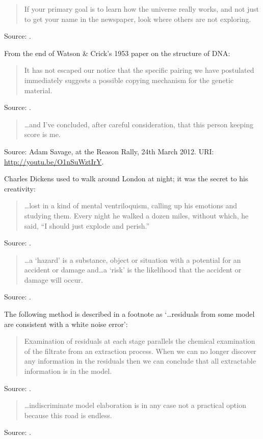 \documentclass[a4paper]{article}
\begin{document}
\begin{quote}
	If your primary goal is to learn how the universe really works, and not just to get your name
in the newspaper, look where others are not exploring.
\end{quote}
Source: \citet{Nather2012}.
\medskip

From the end of Watson \& Crick's 1953 paper on the structure of DNA:
\begin{quote}
	It has not escaped our notice that the specific pairing we have postulated immediately suggests
a possible copying mechanism for the genetic material.
\end{quote}
Source: \citet{Watson1953}.
\medskip

\begin{quote}
	\ldots and I've concluded, after careful consideration, that this person keeping score is me.
\end{quote}
Source: Adam Savage, at the Reason Rally, 24th March 2012.  URI: \url{http://youtu.be/O1nSuWztIrY}.
\medskip

Charles Dickens used to walk around London at night; it was the secret to his creativity:
\begin{quote}
	\ldots lost in a kind of mental ventriloquism, calling up his emotions and studying them. Every
night he walked a dozen miles, without which, he said, ``I should just explode and perish.''
\end{quote}
Source: \citet{Klinkenborg2012}.
\medskip

\begin{quote}
	\ldots a `hazard' is a substance, object or situation with a potential for an accident or
damage and\ldots a `risk' is the likelihood that the accident or damage will occur.
\end{quote}
Source: \citet[p.~5]{Kletz1999b}.
\medskip

The following method is described in a footnote as `\ldots residuals from some model are consistent
with a white noise error':
\begin{quote}
	Examination of residuals at each stage parallels the chemical examination of the filtrate from
an extraction process.  When we can no longer discover any information in the residuals then we can
conclude that all extractable information is in the model.
\end{quote}
Source: \citet[p.~6]{Box1979}.
\medskip

\begin{quote}
	\ldots indiscriminate model elaboration is in any case not a practical option because this road
is endless.
\end{quote}
Source: \citet[p.~2]{Box1979}.
\medskip
\end{document}
